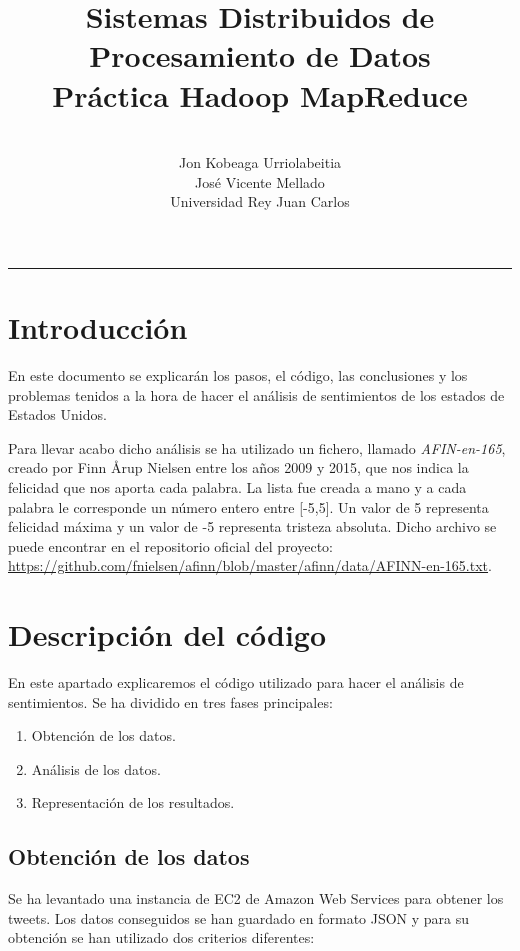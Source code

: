 \documentclass[12pt,a4paper]{article}
\title{Sistemas Distribuidos de Procesamiento de Datos\\Práctica Hadoop MapReduce}
\author{\\Jon Kobeaga Urriolabeitia\\ José Vicente Mellado \\Universidad Rey Juan Carlos}
\begin{document}
\maketitle
\hrule
\tableofcontents
\newpage
\section{Introducción}
En este documento se explicarán los pasos, el código, las conclusiones y los problemas tenidos a la hora de hacer el análisis de sentimientos de los estados de Estados Unidos. 

Para llevar acabo dicho análisis se ha utilizado un fichero, llamado \textit{AFIN-en-165}, creado por Finn Årup Nielsen entre los años 2009 y 2015, que nos indica la felicidad que nos aporta cada palabra. La lista fue creada a mano y a cada palabra le corresponde un número entero entre [-5,5]. Un valor de 5 representa felicidad máxima y un valor de -5 representa tristeza absoluta.
Dicho archivo se puede encontrar en el repositorio oficial del proyecto: \url{https://github.com/fnielsen/afinn/blob/master/afinn/data/AFINN-en-165.txt}.


\section{Descripción del código}

En este apartado explicaremos el código utilizado para hacer el análisis de sentimientos. Se ha dividido en tres fases principales:

\begin{enumerate}
\item Obtención de los datos.
\item Análisis de los datos.
\item Representación de los resultados.
\end{enumerate}

\subsection{Obtención de los datos}
Se ha levantado una instancia de EC2 de Amazon Web Services para obtener los tweets. Los datos conseguidos se han guardado en formato JSON y para su obtención se han utilizado dos criterios diferentes:
\end{document}
